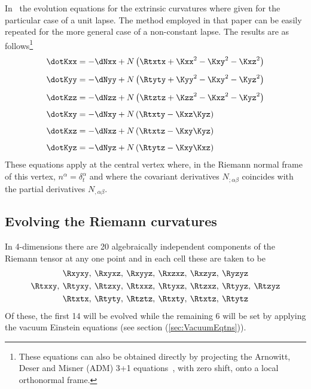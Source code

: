\documentclass[a4paper,12pt]{article}
\numberwithin{equation}{section}
\begin{document}
In~\cite{brewin:2014-01} the evolution equations for the extrinsic curvatures where given
for the particular case of a unit lapse. The method employed in that paper can be easily
repeated for the more general case of a non-constant lapse. The results are as
follows\footnote{These equations can also be obtained directly by projecting the Arnowitt,
Deser and Misner (ADM) 3+1 equations~\cite{mtw:1973-01}, with zero shift, onto a local
orthonormal frame.}
\begin{align}
	\label{eqn:DotKabA}
      \dotKxx &= -\dNxx + N \left(\Rtxtx + \Kxx^2 - \Kxy^2 - \Kxz^2\right)\\[5pt]
	\label{eqn:DotKabB}
      \dotKyy &= -\dNyy + N \left(\Rtyty + \Kyy^2 - \Kxy^2 - \Kyz^2\right)\\[5pt]
	\label{eqn:DotKabC}
      \dotKzz &= -\dNzz + N \left(\Rtztz + \Kzz^2 - \Kxz^2 - \Kyz^2\right)\\[5pt]
	\label{eqn:DotKabD}
      \dotKxy &= -\dNxy + N \left(\Rtxty - \Kxz\Kyz \right)\\[5pt]
	\label{eqn:DotKabE}
      \dotKxz &= -\dNxz + N \left(\Rtxtz - \Kxy\Kyz \right)\\[5pt]
	\label{eqn:DotKabF}
      \dotKyz &= -\dNyz + N \left(\Rtytz - \Kxy\Kxz \right)
\end{align}
These equations apply at the central vertex where, in the Riemann normal frame of this
vertex, $n^\alpha = \delta^\alpha_t$ and where the covariant derivatives
$N_{;\alpha\beta}$ coincides with the partial derivatives $N_{,\alpha\beta}$.

\subsection{Evolving the Riemann curvatures}
\label{sec:DotRabcd}

In 4-dimensions there are 20 algebraically independent components of the Riemann tensor
at any one point and in each cell these are taken to be
\begin{gather}
\Rxyxy,\> \Rxyxz,\> \Rxyyz,\> \Rxzxz,\> \Rxzyz,\> \Ryzyz\notag\\
\Rtxxy,\> \Rtyxy,\> \Rtzxy,\> \Rtxxz,\> \Rtyxz,\> \Rtzxz,\> \Rtyyz,\> \Rtzyz\\
\Rtxtx,\> \Rtyty,\> \Rtztz,\> \Rtxty,\> \Rtxtz,\> \Rtytz\notag
\end{gather}
Of these, the first 14 will be evolved while the remaining 6 will be set by applying
the vacuum Einstein equations (see section (\ref{sec:VacuumEqtns})).
\end{document}
